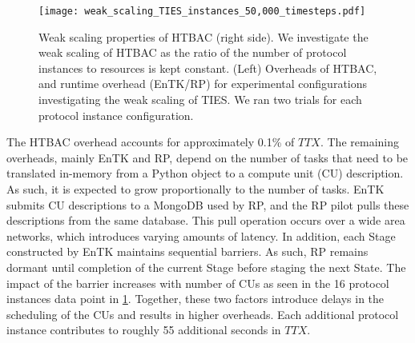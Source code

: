 \begin{figure}
  \centering
   \texttt{[image: weak\_scaling\_TIES\_instances\_50,000\_timesteps.pdf]}
  \caption{Weak scaling properties of HTBAC (right side). We investigate the
  weak scaling of HTBAC as the ratio of the number of protocol instances to
  resources is kept constant. (Left) Overheads of HTBAC, and runtime overhead (EnTK/RP) for
  experimental configurations investigating the weak scaling of TIES. We ran two trials for each protocol instance configuration.}
\label{fig:weak_scaling}
\end{figure}


The HTBAC overhead accounts for approximately 0.1\% of \(TTX\). The remaining
overheads, mainly EnTK and RP, depend on the number of tasks that need to be
translated in-memory from a Python object to a compute unit (CU) description.
As such, it is expected to grow proportionally to the number of tasks. EnTK
submits CU descriptions to a MongoDB used by RP, and the RP pilot pulls these
descriptions from the same database. This pull operation occurs over a wide
area networks, which introduces varying amounts of latency. In addition, each
Stage constructed by EnTK maintains sequential barriers. As such, RP remains
dormant until completion of the current Stage before staging the next State.
The impact of the barrier increases with number of CUs as seen in the 16
protocol instances data point in \ref{fig:weak_scaling}.  Together, these two
factors introduce delays in the scheduling of the CUs and results in higher
overheads. Each additional protocol instance contributes to roughly 55
additional seconds in \(TTX\).









